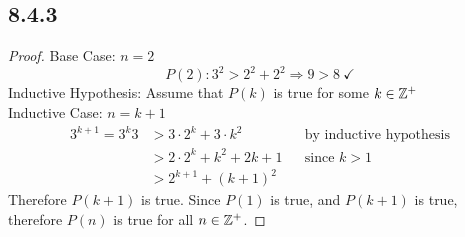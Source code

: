 \subsection*{8.4.3}
\begin{enumerate}
  \begin{proof}
    Base Case: $n = 2$
    \[
      P(2): 3^2 > 2^2 + 2^2 \Rightarrow 9 > 8~\checkmark
    \]
    Inductive Hypothesis: Assume that $P(k)$ is true for some $k \in \mathbb{Z}^+$ \\
    Inductive Case: $n = k + 1$
    \begin{align*}
      3^{k+1} = 3^k3 & > 3\cdot 2^k + 3\cdot k^2   &  & \text{by inductive hypothesis} \\
                     & > 2\cdot 2^k + k^2 + 2k + 1 &  & \text{since $k>1$}             \\
                     & > 2^{k+1} + (k+1)^2
    \end{align*}
    Therefore $P(k+1)$ is true. Since $P(1)$ is true, and $P(k+1)$ is true, therefore $P(n)$ is true for all $n \in \mathbb{Z}^+$.
  \end{proof}
\end{enumerate}

